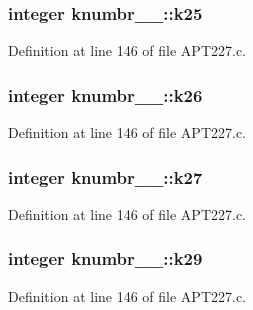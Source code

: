 \subsubsection[{\texorpdfstring{k25}{k25}}]{\setlength{\rightskip}{0pt plus 5cm}integer knumbr\+\_\+\_\+\+::k25}\hypertarget{structknumbr__1___ad5c02116b7bcdbf9e139a471779933d9}{}\label{structknumbr__1___ad5c02116b7bcdbf9e139a471779933d9}


Definition at line 146 of file A\+P\+T227.\+c.

\subsubsection[{\texorpdfstring{k26}{k26}}]{\setlength{\rightskip}{0pt plus 5cm}integer knumbr\+\_\+\_\+\+::k26}\hypertarget{structknumbr__1___ab7f98dde36f1e7c91b19e894d4a9acc7}{}\label{structknumbr__1___ab7f98dde36f1e7c91b19e894d4a9acc7}


Definition at line 146 of file A\+P\+T227.\+c.

\subsubsection[{\texorpdfstring{k27}{k27}}]{\setlength{\rightskip}{0pt plus 5cm}integer knumbr\+\_\+\_\+\+::k27}\hypertarget{structknumbr__1___a9f92392e9aafe7198917c9e982e67390}{}\label{structknumbr__1___a9f92392e9aafe7198917c9e982e67390}


Definition at line 146 of file A\+P\+T227.\+c.

\subsubsection[{\texorpdfstring{k29}{k29}}]{\setlength{\rightskip}{0pt plus 5cm}integer knumbr\+\_\+\_\+\+::k29}\hypertarget{structknumbr__1___ac602f6f1ab605149310afb46241ed76d}{}\label{structknumbr__1___ac602f6f1ab605149310afb46241ed76d}


Definition at line 146 of file A\+P\+T227.\+c.

